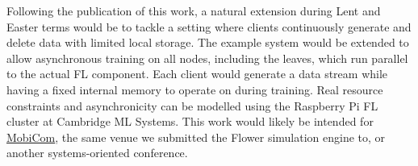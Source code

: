 Following the publication of this work, a natural extension during Lent and Easter terms would be to tackle a setting where clients continuously generate and delete data with limited local storage. The example system would be extended to allow asynchronous training on all nodes, including the leaves, which run parallel to the actual FL component. Each client would generate a data stream while having a fixed internal memory to operate on during training. Real resource constraints and asynchronicity can be modelled using the Raspberry Pi FL cluster at Cambridge ML Systems. This work would likely be intended for \href{https://sigmobile.org/mobicom/2023/}{MobiCom}, the same venue we submitted the Flower simulation engine to, or another systems-oriented conference.
